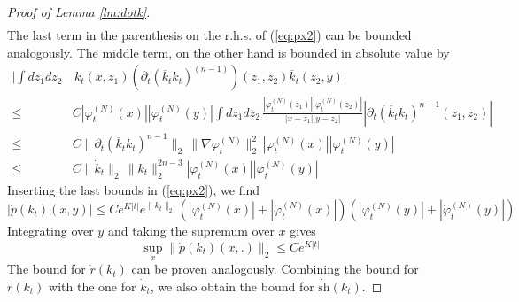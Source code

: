 \documentclass[11pt,a4paper]{article}
\newcommand{\ph}{\varphi_t^{(N)}}	%
\newcommand{\phdot}{\dot{\varphi}_t^{(N)}}	%
\begin{document}
\begin{proof}[Proof of Lemma \ref{lm:dotk}]
\[\begin{split}
 \end{split}
\]
The last term in the parenthesis on the r.h.s. of (\ref{eq:px2}) can be bounded analogously. 
The middle term, on the other hand is bounded in absolute value by
\[ \begin{split}
\Big|  \int dz_1 dz_2 & \, k_t (x,z_1) (\partial_t (\overline{k}_t k_t)^{(n-1)}) (z_1 ,z_2) \overline{k}_t (z_2 ,y ) \Big|
 \\ \leq \; & C |\ph (x)| |\ph(y)| \int dz_1 dz_2 \, \frac{ |\ph (z_1)| |\ph (z_2)|}{|x-z_1| |y-z_2|} |\partial_t (\overline{k}_t k_t)^{n-1} (z_1, z_2)|  \\
\leq \; &C \| \partial_t (\overline{k}_t k_t)^{n-1} \|_2 \, \| \nabla \ph \|_2^2 \,   |\ph (x)| |\ph(y)| 
\\
\leq \; &C \| \dot{k}_t \|_2 \, \| k_t \|_2^{2n-3} |\ph (x)| |\ph (y)| 
\end{split}\] 
Inserting the last bounds in (\ref{eq:px2}), we find
\[ |\dot{p} (k_t) (x,y)| \leq C e^{K |t|}  e^{\| k_t \|_2} \, (|\ph (x)| + |\phdot (x)|) (|\ph (y)| +|\phdot (y)|)  \]
Integrating over $y$ and taking the supremum over $x$ gives
\[ \sup_x \| \dot{p} (k_t) (x,.) \|_2 \leq C e^{K |t|} \]
The bound for $\dot{r} (k_t)$ can be proven analogously. Combining the bound for $\dot{r} (k_t)$ with the one for $\dot{k}_t$, we also obtain the bound for $\dot{\text{sh}} (k_t)$.
\end{proof}
\end{document}

